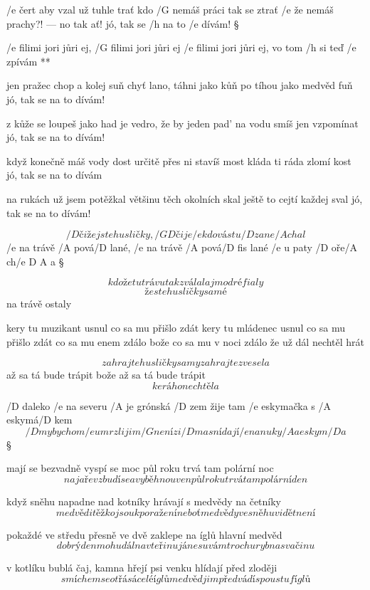 /e čert aby vzal už tuhle trať
kdo /G nemáš práci tak se ztrať
/e že nemáš prachy?! --- no tak ať!
jó, tak se /h na to /e dívám! \S

\R /e filimi jori jůri ej, /G filimi jori jůri ej
   /e filimi jori jůri ej, vo tom /h si teď /e zpívám **

jen pražec chop a kolej suň
chyť lano, táhni jako kůň
po tíhou jako medvěd fuň
jó, tak se na to dívám! \s

z kůže se loupeš jako had
je vedro, že by jeden pad'
na vodu smíš jen vzpomínat
jó, tak se na to dívám! \s

když konečně máš vody dost
určitě přes ni stavíš most
kláda ti ráda zlomí kost
jó, tak se na to dívám \s

na rukách už jsem potěžkal
většinu těch okolních skal
ještě to cejtí každej sval
jó, tak se na to dívám! \s




\[ /D čiže jste husličky, /{G D} čije
/e kdo vás tu /D zane/A chal \]
/e na trávě /A pová/D lané, /e na trávě /A pová/{D fis} lané
/e u paty /D oře/A ch/{e D A} a \S

\[ kdože tu trávu tak zválal
aj modré fialy \]
\[ že ste husličky samé \]
na trávě ostaly \s

kery tu muzikant usnul
co sa mu přišlo zdát
kery tu mládenec usnul
co sa mu přišlo zdát
co sa mu enem zdálo
bože co sa mu v noci zdálo
že už dál nechtěl hrát \s

\[ zahrajte husličky samy
zahrajte zvesela \]
až sa tá bude trápit
bože až sa tá bude trápit
\[ kerá ho nechtěla \]




/D daleko /e na severu /A je grónská /D zem
žije tam /e eskymačka s /A eskymá/D kem
\[ /D my bychom /e umrzli jim /G není zi/D ma
snídají /e nanuky /A a eskym/D a \]\S

mají se bezvadně vyspí se moc
půl roku trvá tam polární noc
\[ na jaře vzbudí se a vyběhnou ven
půl roku trvá tam polární den \]\s

když sněhu napadne nad kotníky
hrávají s medvědy na četníky
\[ medvědi těžko jsou k poražení
neboť medvědy ve sněhu vidět není \]\s

pokaždé ve středu přesně ve dvě
zaklepe na íglů hlavní medvěd
\[ dobrý den mohu dál na vteřinu
já nesu vám trochu ryb na svačinu \]\s

v kotlíku bublá čaj, kamna hřejí
psi venku hlídají před zloději
\[ smíchem se otřásá celé íglů
medvěd jim předvádí spoustu fíglů \]\s

